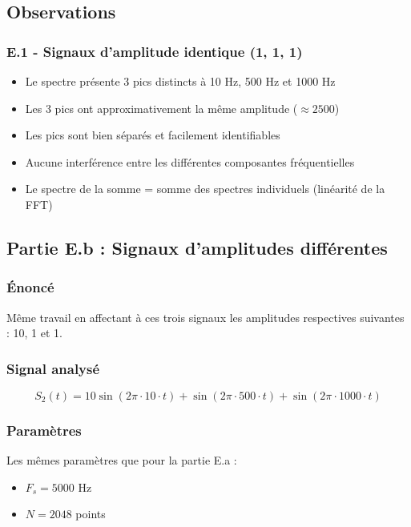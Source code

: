 \documentclass[12pt,a4paper]{article}
\begin{document}
\subsection{Observations}

\subsubsection{E.1 - Signaux d'amplitude identique (1, 1, 1)}

\begin{itemize}
    \item Le spectre présente 3 pics distincts à 10 Hz, 500 Hz et 1000 Hz
    \item Les 3 pics ont approximativement la même amplitude ($\approx 2500$)
    \item Les pics sont bien séparés et facilement identifiables
    \item Aucune interférence entre les différentes composantes fréquentielles
    \item Le spectre de la somme = somme des spectres individuels (linéarité de la FFT)
\end{itemize}

\subsection{Partie E.b : Signaux d'amplitudes différentes}

\subsubsection{Énoncé}

Même travail en affectant à ces trois signaux les amplitudes respectives suivantes : 10, 1 et 1.

\subsubsection{Signal analysé}

\begin{equation}
    S_2(t) = 10 \sin(2\pi \cdot 10 \cdot t) + \sin(2\pi \cdot 500 \cdot t) + \sin(2\pi \cdot 1000 \cdot t)
\end{equation}

\subsubsection{Paramètres}

Les mêmes paramètres que pour la partie E.a :
\begin{itemize}
    \item $F_s = 5000$ Hz
    \item $N = 2048$ points
\end{itemize}
\end{document}
